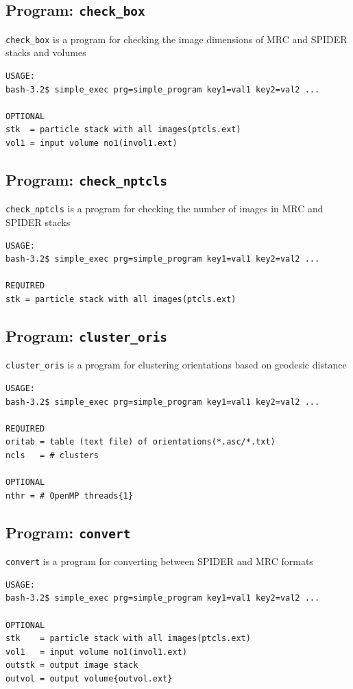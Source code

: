 \documentclass[a4paper,11pt]{article}
\newcommand{\prgname}[1]{\textcolor{NavyBlue}{\texttt{#1}}}
\begin{document}
\subsection{Program: \prgname{check\_box}}
\label{check_box}
\prgname{check\_box} is a program for checking the image dimensions of MRC and SPIDER stacks and volumes

\begin{verbatim}
USAGE:
bash-3.2$ simple_exec prg=simple_program key1=val1 key2=val2 ...

OPTIONAL
stk  = particle stack with all images(ptcls.ext)
vol1 = input volume no1(invol1.ext)
\end{verbatim}

\subsection{Program: \prgname{check\_nptcls}}
\label{check_nptcls}
\prgname{check\_nptcls} is a program for checking the number of images in MRC and SPIDER stacks

\begin{verbatim}
USAGE:
bash-3.2$ simple_exec prg=simple_program key1=val1 key2=val2 ...

REQUIRED
stk = particle stack with all images(ptcls.ext)
\end{verbatim}

\subsection{Program: \prgname{cluster\_oris}}
\label{cluster_oris}
\prgname{cluster\_oris} is a program for clustering orientations based on geodesic distance

\begin{verbatim}
USAGE:
bash-3.2$ simple_exec prg=simple_program key1=val1 key2=val2 ...

REQUIRED
oritab = table (text file) of orientations(*.asc/*.txt)
ncls   = # clusters

OPTIONAL
nthr = # OpenMP threads{1}
\end{verbatim}

\subsection{Program: \prgname{convert}}
\label{convert}
\prgname{convert} is a program for converting between SPIDER and MRC formats 

\begin{verbatim}
USAGE:
bash-3.2$ simple_exec prg=simple_program key1=val1 key2=val2 ...

OPTIONAL
stk    = particle stack with all images(ptcls.ext)
vol1   = input volume no1(invol1.ext)
outstk = output image stack
outvol = output volume{outvol.ext}
\end{verbatim}
\end{document}
